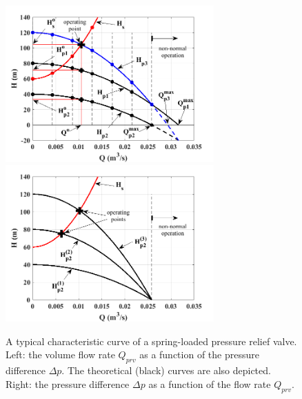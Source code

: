 \begin{figure}[ht!]
	\centering
		\includegraphics[width=8cm]{Control/Figures/TheorySerialConnection.png}
		\includegraphics[width=8cm]{Control/Figures/TheorySerialConnection_SamePumps.png}
	\caption{A typical characteristic curve of a spring-loaded pressure relief valve. Left: the volume flow rate $Q_{prv}$ as a function of the pressure difference $\Delta p$. The theoretical (black) curves are also depicted. Right: the pressure difference $\Delta p$ as a function of the flow rate $Q_{prv}$.}
	\label{fig:example_serial_connection}
\end{figure}

